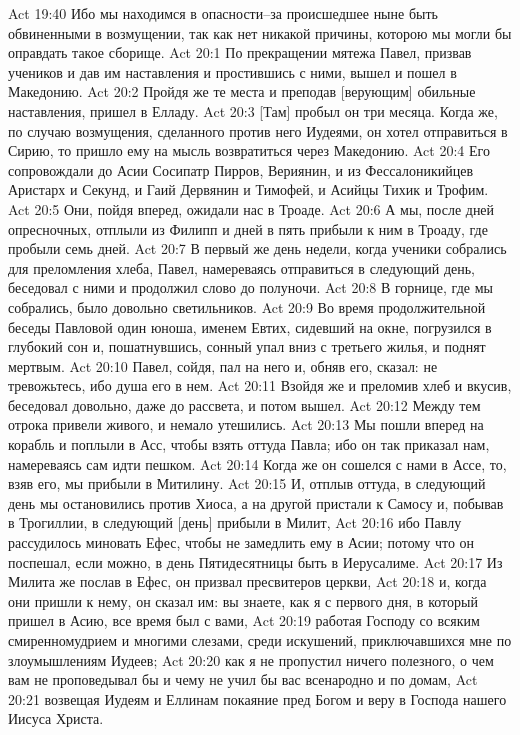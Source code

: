 Act 19:40  Ибо мы находимся в опасности--за происшедшее ныне быть обвиненными в возмущении, так как нет никакой причины, которою мы могли бы оправдать такое сборище.
Act 20:1  По прекращении мятежа Павел, призвав учеников и дав им наставления и простившись с ними, вышел и пошел в Македонию.
Act 20:2  Пройдя же те места и преподав [верующим] обильные наставления, пришел в Елладу.
Act 20:3  [Там] пробыл он три месяца. Когда же, по случаю возмущения, сделанного против него Иудеями, он хотел отправиться в Сирию, то пришло ему на мысль возвратиться через Македонию.
Act 20:4  Его сопровождали до Асии Сосипатр Пирров, Вериянин, и из Фессалоникийцев Аристарх и Секунд, и Гаий Дервянин и Тимофей, и Асийцы Тихик и Трофим.
Act 20:5  Они, пойдя вперед, ожидали нас в Троаде.
Act 20:6  А мы, после дней опресночных, отплыли из Филипп и дней в пять прибыли к ним в Троаду, где пробыли семь дней.
Act 20:7  В первый же день недели, когда ученики собрались для преломления хлеба, Павел, намереваясь отправиться в следующий день, беседовал с ними и продолжил слово до полуночи.
Act 20:8  В горнице, где мы собрались, было довольно светильников.
Act 20:9  Во время продолжительной беседы Павловой один юноша, именем Евтих, сидевший на окне, погрузился в глубокий сон и, пошатнувшись, сонный упал вниз с третьего жилья, и поднят мертвым.
Act 20:10  Павел, сойдя, пал на него и, обняв его, сказал: не тревожьтесь, ибо душа его в нем.
Act 20:11  Взойдя же и преломив хлеб и вкусив, беседовал довольно, даже до рассвета, и потом вышел.
Act 20:12  Между тем отрока привели живого, и немало утешились.
Act 20:13  Мы пошли вперед на корабль и поплыли в Асс, чтобы взять оттуда Павла; ибо он так приказал нам, намереваясь сам идти пешком.
Act 20:14  Когда же он сошелся с нами в Ассе, то, взяв его, мы прибыли в Митилину.
Act 20:15  И, отплыв оттуда, в следующий день мы остановились против Хиоса, а на другой пристали к Самосу и, побывав в Трогиллии, в следующий [день] прибыли в Милит,
Act 20:16  ибо Павлу рассудилось миновать Ефес, чтобы не замедлить ему в Асии; потому что он поспешал, если можно, в день Пятидесятницы быть в Иерусалиме.
Act 20:17  Из Милита же послав в Ефес, он призвал пресвитеров церкви,
Act 20:18  и, когда они пришли к нему, он сказал им: вы знаете, как я с первого дня, в который пришел в Асию, все время был с вами,
Act 20:19  работая Господу со всяким смиренномудрием и многими слезами, среди искушений, приключавшихся мне по злоумышлениям Иудеев;
Act 20:20  как я не пропустил ничего полезного, о чем вам не проповедывал бы и чему не учил бы вас всенародно и по домам,
Act 20:21  возвещая Иудеям и Еллинам покаяние пред Богом и веру в Господа нашего Иисуса Христа.
